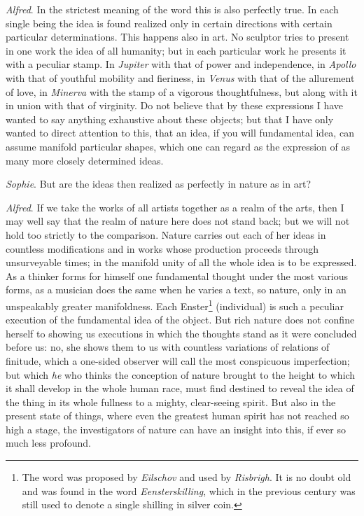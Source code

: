 \documentclass[12pt,a4paper,openany]{book}
\newcommand{\opage}[1]{\marginnote{\footnotesize\textit{[#1]}}}
\begin{document}
\emph{Alfred}. In the strictest meaning of the word this is also perfectly true. In
each single being the idea is found realized only in certain directions with
certain particular determinations. This happens also in art. No sculptor tries to
present in one work the idea of all humanity; but in each particular work he
presents it with a peculiar stamp. In \emph{Jupiter} with that of power and
independence, in \emph{Apollo} with that of youthful mobility and fieriness, in
\emph{Venus} with that of the allurement of love, in \emph{Minerva} with the stamp of
a vigorous thoughtfulness, but along with it in union with that of virginity. Do not
believe that by these expressions I have wanted to say anything exhaustive about
these objects; but that I have only wanted to direct attention to this, that an
idea, if you will fundamental idea, can assume manifold particular shapes, which one
can regard as the expression of as many more closely determined ideas.

\emph{Sophie}. But are the ideas then realized as perfectly in nature as in art?

\emph{Alfred}. If we take the works of all artists together as a realm of the arts,
then I may well say that the realm of nature here
\setcounter{footnote}{0}%
\opage{65}does not stand back; but we will not hold too strictly to the comparison.
Nature carries out each of her ideas in countless modifications and in works whose
production proceeds through unsurveyable times; in the manifold unity of all the
whole idea is to be expressed. As a thinker forms for himself one fundamental
thought under the most various forms, as a musician does the same when he varies a
text, so nature, only in an unspeakably greater manifoldness. Each Enster\footnote[1]{The word was proposed by \emph{Eilschov} and used by \emph{Risbrigh}. It is no doubt old and was found in the word \emph{Eensterskilling}, which in the previous century was still used to denote a single shilling in silver coin.}
(individual) is such a peculiar execution of the fundamental idea of the object. But
rich nature does not confine herself to showing us executions in which the thoughts
stand as it were concluded before us: no, she shows them to us with countless
variations of relations of finitude, which a one-sided observer will call the most
conspicuous imperfection; but which \emph{he} who thinks the conception of nature brought
to the height to which it shall develop in the whole human race, must find destined
to reveal the idea of the thing in its whole fullness to a mighty, clear-seeing
spirit. But also in the present state of things, where even the greatest human
spirit has not reached so high a stage, the investigators of nature can have an
insight into this, if ever so much less profound.
\end{document}
